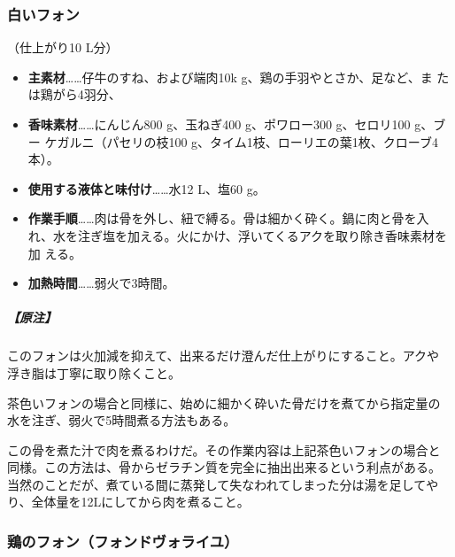 \begin{recette}
\hypertarget{fonds-blanc}{%
\subsubsection{白いフォン}\label{fonds-blanc}}



（仕上がり10 L分）

\begin{itemize}
\item
  \textbf{主素材}\ldots{}\ldots{}仔牛のすね、および端肉10k
  g、鶏の手羽やとさか、足など、ま たは鶏がら4羽分、
\item
  \textbf{香味素材}\ldots{}\ldots{}にんじん800 g、玉ねぎ400
  g、ポワロー300 g、セロリ100 g、ブー ケガルニ（パセリの枝100
  g、タイム1枝、ローリエの葉1枚、クローブ4本）。
\item
  \textbf{使用する液体と味付け}\ldots{}\ldots{}水12 L、塩60 g。
\item
  \textbf{作業手順}\ldots{}\ldots{}肉は骨を外し、紐で縛る。骨は細かく砕く。鍋に肉と骨を入
  れ、水を注ぎ塩を加える。火にかけ、浮いてくるアクを取り除き香味素材を加
  える。
\item
  \textbf{加熱時間}\ldots{}\ldots{}弱火で3時間。
\end{itemize}

\hypertarget{nota-fonds-blanc}{%
\subparagraph{【原注】}\label{nota-fonds-blanc}}

このフォンは火加減を抑えて、出来るだけ澄んだ仕上がりにすること。アクや
浮き脂は丁寧に取り除くこと。

茶色いフォンの場合と同様に、始めに細かく砕いた骨だけを煮てから指定量の
水を注ぎ、弱火で5時間煮る方法もある。

この骨を煮た汁で肉を煮るわけだ。その作業内容は上記茶色いフォンの場合と
同様。この方法は、骨からゼラチン質を完全に抽出出来るという利点がある。
当然のことだが、煮ている間に蒸発して失なわれてしまった分は湯を足してや
り、全体量を12Lにしてから肉を煮ること。

\hypertarget{fonds-de-volaille}{%
\subsubsection{鶏のフォン（フォンドヴォライユ）}\label{fonds-de-volaille}}




\end{recette}
